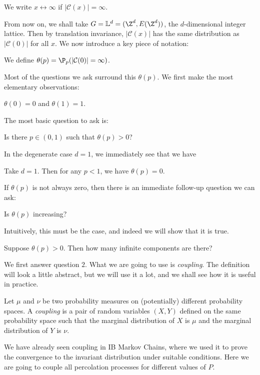 \documentclass[a4paper]{article}
\renewcommand\L{\mathbb{L}}
\begin{document}
\begin{notation}
  We write $x \leftrightarrow \infty$ if $|\mathcal{C}(x)| = \infty$.
\end{notation}

From now on, we shall take $G = \L^d = (\Z^d, E(\Z^d))$, the $d$-dimensional integer lattice.\index{$\L^d$} Then by translation invariance, $|\mathcal{C}(x)|$ has the same distribution as $|\mathcal{C}(0)|$ for all $x$. We now introduce a key piece of notation:
\begin{defi}[$\theta(p)$]
  We define $\theta(p) = \P_p(|\mathcal{C}(0)| = \infty)$.
\end{defi}

Most of the questions we ask surround this $\theta(p)$. We first make the most elementary observations:
\begin{eg}
  $\theta(0) = 0$ and $\theta(1) = 1$.
\end{eg}

The most basic question to ask is:
\begin{question}
  Is there $p \in (0, 1)$ such that $\theta(p) > 0$?
\end{question}

In the degenerate case $d = 1$, we immediately see that we have
\begin{eg}
  Take $d = 1$. Then for any $p < 1$, we have $\theta(p) = 0$.
\end{eg}

If $\theta(p)$ is not always zero, then there is an immediate follow-up question we can ask:
\begin{question}
  Is $\theta(p)$ increasing?
\end{question}
Intuitively, this must be the case, and indeed we will show that it is true.

\begin{question}
  Suppose $\theta(p) > 0$. Then how many infinite components are there?
\end{question}

We first answer question $2$. What we are going to use is \emph{coupling}. The definition will look a little abstract, but we will use it a lot, and we shall see how it is useful in practice.

\begin{defi}[Coupling]
  Let $\mu$ and $\nu$ be two probability measures on (potentially) different probability spaces. A \emph{coupling} is a pair of random variables $(X, Y)$ defined on the same probability space such that the marginal distribution of $X$ is $\mu$ and the marginal distribution of $Y$ is $\nu$.
\end{defi}
We have already seen coupling in IB Markov Chains, where we used it to prove the convergence to the invariant distribution under suitable conditions. Here we are going to couple all percolation processes for different values of $P$.
\end{document}

